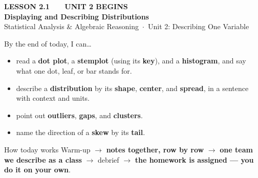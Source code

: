 \documentclass[aspectratio=169, 11pt]{beamer}
\begin{document}
{
\begin{frame}[plain]
  \vspace{2.8cm}\hspace{0.55cm}%
  \begin{minipage}{0.9\textwidth}
    {\color{goldacc}\bfseries\small LESSON 2.1 \ \textbullet\ \ UNIT 2 BEGINS}\\[0.5cm]
    {\color{white}\bfseries\LARGE Displaying and Describing Distributions}\\[1.2cm]
    {\color{frostmid}\small Statistical Analysis \& Algebraic Reasoning~$\cdot$~Unit 2: Describing One Variable}
  \end{minipage}
\end{frame}
}

\begin{frame}[t, plain]
  By the end of today, I can\ldots
  \begin{itemize}\setlength{\itemsep}{4pt}
    \item read a \textbf{dot plot}, a \textbf{stemplot} (using its \textbf{key}), and a
          \textbf{histogram}, and say what one dot, leaf, or bar stands for.
    \item describe a \textbf{distribution} by its \textbf{shape}, \textbf{center}, and
          \textbf{spread}, in a sentence with context and units.
    \item point out \textbf{outliers}, \textbf{gaps}, and \textbf{clusters}.
    \item name the direction of a \textbf{skew} by its \textbf{tail}.
  \end{itemize}
  \begin{block}{How today works}
    Warm-up $\to$ \textbf{notes together, row by row} $\to$ \textbf{one team we describe as a
    class} $\to$ debrief $\to$ \textbf{the homework is assigned --- you do it on your own}.
  \end{block}
\end{frame}
\end{document}
